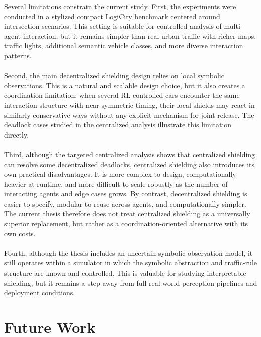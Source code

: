 Several limitations constrain the current study. First, the experiments were conducted in a stylized compact LogiCity benchmark centered around intersection scenarios. This setting is suitable for controlled analysis of multi-agent interaction, but it remains simpler than real urban traffic with richer maps, traffic lights, additional semantic vehicle classes, and more diverse interaction patterns.
\\
\\
Second, the main decentralized shielding design relies on local symbolic observations. This is a natural and scalable design choice, but it also creates a coordination limitation: when several RL-controlled cars encounter the same interaction structure with near-symmetric timing, their local shields may react in similarly conservative ways without any explicit mechanism for joint release. The deadlock cases studied in the centralized analysis illustrate this limitation directly.
\\
\\
Third, although the targeted centralized analysis shows that centralized shielding can resolve some decentralized deadlocks, centralized shielding also introduces its own practical disadvantages. It is more complex to design, computationally heavier at runtime, and more difficult to scale robustly as the number of interacting agents and edge cases grows. By contrast, decentralized shielding is easier to specify, modular to reuse across agents, and computationally simpler. The current thesis therefore does not treat centralized shielding as a universally superior replacement, but rather as a coordination-oriented alternative with its own costs.
\\
\\
Fourth, although the thesis includes an uncertain symbolic observation model, it still operates within a simulator in which the symbolic abstraction and traffic-rule structure are known and controlled. This is valuable for studying interpretable shielding, but it remains a step away from full real-world perception pipelines and deployment conditions.

\section{Future Work}


